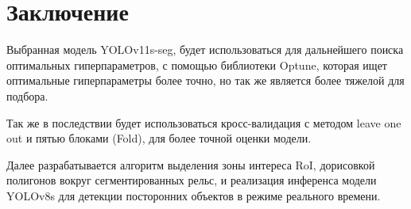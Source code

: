 \documentclass[areasetadvanced]{scrartcl}
\begin{document}
\newpage
\section*{Заключение}
Выбранная модель YOLOv11s-seg, будет использоваться для дальнейшего поиска оптимальных гиперпараметров, с помощью библиотеки Optune, 
которая ищет оптимальные гиперпараметры более точно, но так же является более тяжелой для подбора. 

Так же в последствии будет использоваться кросс-валидация с методом leave one out и пятью блоками (Fold), для более точной оценки модели.

Далее разрабатывается алгоритм выделения зоны интереса RoI, дорисовкой полигонов вокруг сегментированных рельс, и реализация инференса модели YOLOv8s для детекции посторонних объектов в режиме реального времени.
\end{document}
